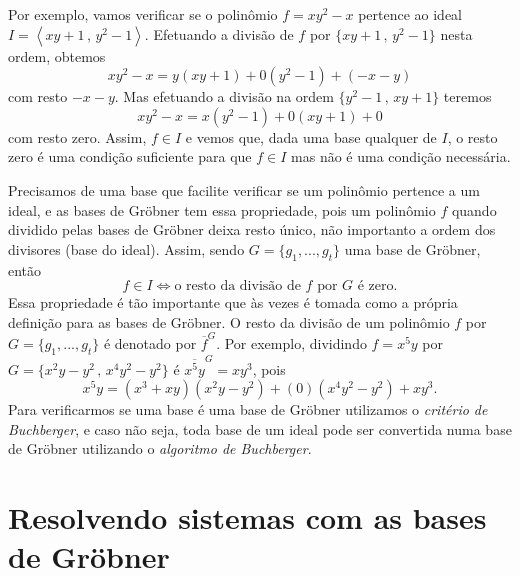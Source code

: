 \documentclass[a4paper,12pt,oneside,onecolumn,final,fleqn]{repUERJ}
\begin{document}
Por exemplo, vamos verificar se o polinômio $f=xy^2-x$ pertence ao ideal $I=\left\langle xy+1\,,\,y^2-1 \right\rangle$. Efetuando a divisão de $f$ por $\{xy+1\,,\,y^2-1\}$ nesta ordem, obtemos
\begin{equation*}
xy^2-x=y(xy+1)+0(y^2-1)+(-x-y)
\end{equation*}  
com resto $-x-y$. Mas efetuando a divisão na ordem $\{y^2-1\,,\,xy+1\}$ teremos
\begin{equation*}
xy^2-x=x(y^2-1)+0(xy+1)+0
\end{equation*} 
com resto zero. Assim, $f\in I$ e vemos que, dada uma base qualquer de $I$, o resto zero é uma condição suficiente para que $f\in I$ mas não é uma condição necessária. 

Precisamos de uma base que facilite verificar se um polinômio pertence a um ideal, e as bases de Gr\"obner tem essa propriedade, pois um polinômio $f$ quando dividido pelas bases de Gr\"obner deixa resto único, não importanto a ordem dos divisores (base do ideal). Assim, sendo $G=\{g_1,...,g_t\}$ uma base de Gr\"obner, então 
\begin{equation*}
f\in I \Leftrightarrow \text{o resto da divisão de $f$ por $G$ é zero}.
\end{equation*}
Essa propriedade é tão importante que às vezes é tomada como a própria definição para as bases de Gr\"obner. O resto da divisão de um polinômio $f$ por $G=\{g_1,...,g_t\}$ é denotado por $\overline{f}^G$. Por exemplo, dividindo $f=x^5y$ por $G=\{x^2y-y^2\,,\,x^4y^2-y^2\}$ é $\overline{x^5y}^G=xy^3$, pois
\begin{equation*}
x^5y=(x^3+xy)(x^2y-y^2)+(0)(x^4y^2-y^2)+xy^3.
\end{equation*}
Para verificarmos se uma base é uma base de Gr\"obner utilizamos o {\it critério de Buchberger}, e caso não seja, toda base de um ideal pode ser convertida numa base de Gr\"obner utilizando o {\it algoritmo de Buchberger}. 

\section{Resolvendo sistemas com as bases de Gr\"obner}
\end{document}
